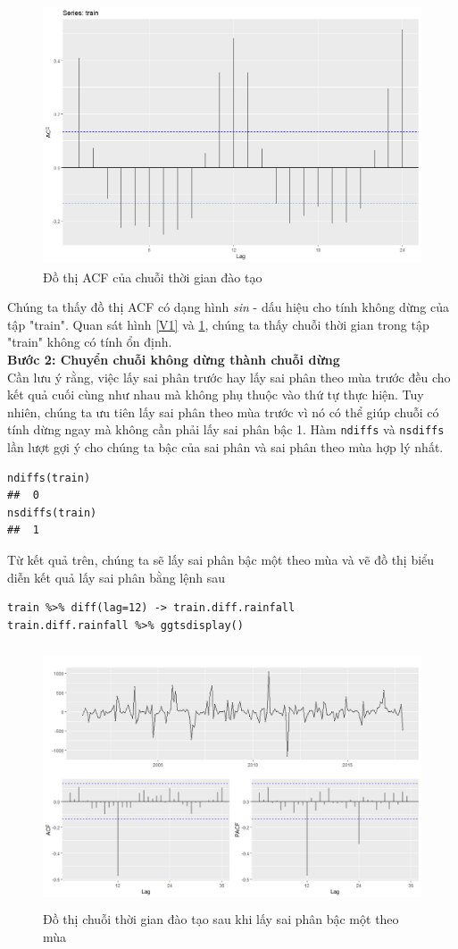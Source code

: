 \documentclass[12pt, a4paper,oneside]{book}
\theoremstyle{definition}
\begin{document}
\begin{figure}[!htb]
	\centering
	\includegraphics[width=1\linewidth,height=7.7cm]{anh/acfrainfall}
	\vskip-4mm 
	\caption{Đồ thị ACF của chuỗi thời gian đào tạo}  
	\label{V5}
\end{figure}
Chúng ta thấy đồ thị ACF có dạng hình \textit{sin} - dấu hiệu cho tính không dừng của tập "train". Quan sát hình \ref{V1} và \ref{V5}, chúng ta thấy chuỗi thời gian trong tập "train" không có tính ổn định.\\
\textbf{Bước 2: Chuyển chuỗi không dừng thành chuỗi dừng}\\
Cần lưu ý rằng, việc lấy sai phân trước hay lấy sai phân theo mùa trước đều cho kết quả cuối cùng như nhau mà không phụ thuộc vào thứ tự thực hiện. Tuy nhiên, chúng ta ưu tiên lấy sai phân theo mùa trước vì nó có thể giúp chuỗi có tính dừng ngay mà không cần phải lấy sai phân bậc 1. Hàm \lstinline{ndiffs} và \lstinline{nsdiffs} lần lượt gợi ý cho chúng ta bậc của sai phân và sai phân theo mùa hợp lý nhất.
\begin{lstlisting}
ndiffs(train)
##  0
nsdiffs(train)
##  1
\end{lstlisting}
Từ kết quả trên, chúng ta sẽ lấy sai phân bậc một theo mùa và vẽ đồ thị biểu diễn kết quả lấy sai phân bằng lệnh sau
\begin{lstlisting}
train %>% diff(lag=12) -> train.diff.rainfall
train.diff.rainfall %>% ggtsdisplay()
\end{lstlisting}
\begin{figure}[!htb]
	\centering
	\includegraphics[width=1\linewidth,height=7.7cm]{anh/V6}
	\vskip-4mm 
	\caption{Đồ thị chuỗi thời gian đào tạo sau khi lấy sai phân bậc một theo mùa}  
	\label{V6}
\end{figure}
\end{document}
